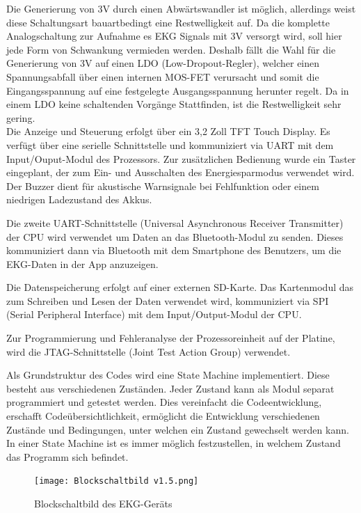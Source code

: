 Die Generierung von 3V durch einen Abwärtswandler ist möglich, allerdings weist diese Schaltungsart bauartbedingt eine Restwelligkeit auf. Da die komplette Analogschaltung zur Aufnahme es EKG Signals mit 3V versorgt wird, soll hier jede Form von Schwankung vermieden werden.
Deshalb fällt die Wahl für die Generierung von 3V auf einen LDO (Low-Dropout-Regler), welcher einen Spannungsabfall über einen internen MOS-FET verursacht und somit die Eingangsspannung auf eine festgelegte Ausgangsspannung herunter regelt. Da in einem LDO keine schaltenden Vorgänge Stattfinden, ist die Restwelligkeit sehr gering.\\

Die Anzeige und Steuerung erfolgt über ein 3,2 Zoll TFT Touch Display. Es verfügt über eine serielle Schnittstelle und kommuniziert via UART mit dem Input/Ouput-Modul des Prozessors. Zur zusätzlichen Bedienung wurde ein Taster eingeplant, der zum Ein- und Ausschalten des Energiesparmodus verwendet wird. Der Buzzer dient für akustische Warnsignale bei Fehlfunktion oder einem niedrigen Ladezustand des Akkus.

Die zweite UART-Schnittstelle (Universal Asynchronous Receiver Transmitter) der CPU wird verwendet um Daten an das Bluetooth-Modul zu senden. Dieses kommuniziert dann via Bluetooth mit dem Smartphone des Benutzers, um die EKG-Daten in der App anzuzeigen.

Die Datenspeicherung erfolgt auf einer externen SD-Karte. Das Kartenmodul das zum Schreiben und Lesen der Daten verwendet wird, kommuniziert via SPI (Serial Peripheral Interface) mit dem Input/Output-Modul der CPU.

Zur Programmierung und Fehleranalyse der Prozessoreinheit auf der Platine, wird die JTAG-Schnittstelle (Joint Test Action Group) verwendet.

Als Grundstruktur des Codes wird eine State Machine implementiert. Diese besteht aus verschiedenen Zuständen. Jeder Zustand kann als Modul separat programmiert und getestet werden. Dies vereinfacht die Codeentwicklung, erschafft Codeübersichtlichkeit, ermöglicht die Entwicklung verschiedenen Zustände und Bedingungen, unter welchen ein Zustand gewechselt werden kann. In einer State Machine ist es immer möglich festzustellen, in welchem Zustand das Programm sich befindet. 

\begin{figure} [h]
	\texttt{[image: Blockschaltbild v1.5.png]}
	\caption{Blockschaltbild des EKG-Geräts}
	\label{fig_Blockschaltbild} 
\end{figure}


